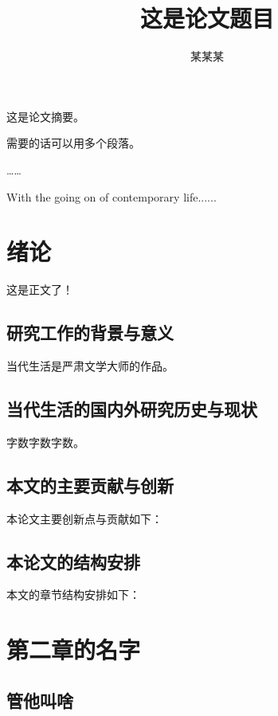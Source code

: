 \documentclass[bachelor]{njupthesis}
\title{这是论文题目}
\author{某某某}
\begin{document}
\makecover

\begin{chineseabstract}
这是论文摘要。 

需要的话可以用多个段落。

……

\end{chineseabstract}

\begin{englishabstract}
With the going on of contemporary life......



\end{englishabstract}

\thesistableofcontents

\thesischapterexordium

\chapter{绪论}
这是正文了！

\section{研究工作的背景与意义}

当代生活是严肃文学大师的作品。


\section{当代生活的国内外研究历史与现状}
字数字数字数。

\section{本文的主要贡献与创新}
本论文主要创新点与贡献如下：

\section{本论文的结构安排}
本文的章节结构安排如下：


\chapter{第二章的名字}

\section{管他叫啥}
\end{document}
